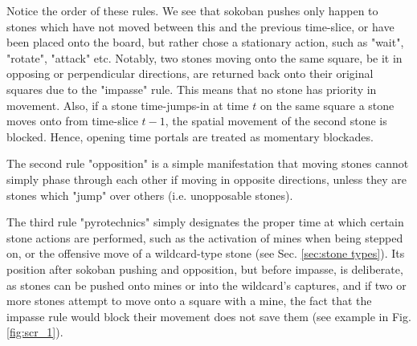 \documentclass[12pt]{article}
\begin{document}
	Notice the order of these rules. We see that sokoban pushes only happen to stones which have not moved between this and the previous time-slice, or have been placed onto the board, but rather chose a stationary action, such as "wait", "rotate", "attack" etc. Notably, two stones moving onto the same square, be it in opposing or perpendicular directions, are returned back onto their original squares due to the "impasse" rule. This means that no stone has priority in movement. Also, if a stone time-jumps-in at time $t$ on the same square a stone moves onto from time-slice $t-1$, the spatial movement of the second stone is blocked. Hence, opening time portals are treated as momentary blockades.%
	
	
	The second rule "opposition" is a simple manifestation that moving stones cannot simply phase through each other if moving in opposite directions, unless they are stones which "jump" over others (i.e. unopposable stones).
	
	The third rule "pyrotechnics" simply designates the proper time at which certain stone actions are performed, such as the activation of mines when being stepped on, or the offensive move of a wildcard-type stone (see Sec. \ref{sec:stone types}). Its position after sokoban pushing and opposition, but before impasse, is deliberate, as stones can be pushed onto mines or into the wildcard's captures, and if two or more stones attempt to move onto a square with a mine, the fact that the impasse rule would block their movement does not save them (see example in Fig. \ref{fig:scr_1}).
	
\end{document}
